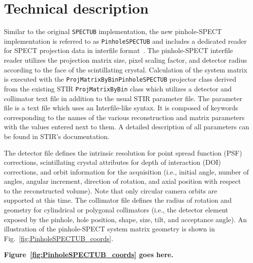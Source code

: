 \documentclass[utf8]{FrontiersinHarvard} %
\begin{document}
\section{Technical description}

Similar to the original \texttt{SPECTUB} implementation, the new pinhole-SPECT implementation is referred to as \texttt{PinholeSPECTUB} and includes a dedicated reader for SPECT projection data in interfile format~\cite{interfile}. The pinhole-SPECT interfile reader utilizes the projection matrix size, pixel scaling factor, and detector radius according to the face of the scintillating crystal. Calculation of the system matrix is executed with the \texttt{ProjMatrixByBinPinholeSPECTUB} projector class derived from the existing STIR \texttt{ProjMatrixByBin} class which utilizes a detector and collimator text file in addition to the usual STIR parameter file. The parameter file is a text file which uses an Interfile-like syntax. It is composed of keywords corresponding to the names of the various reconstruction and matrix parameters with the values entered next to them. A detailed description of all parameters can be found in STIR's documentation.

The detector file defines the intrinsic resolution for point spread function (PSF) corrections, scintillating crystal attributes for depth of interaction (DOI) corrections, and orbit information for the acquisition (i.e., initial angle, number of angles, angular increment, direction of rotation, and axial position with respect to the reconstructed volume). Note that only circular camera orbits are supported at this time. The collimator file defines the radius of rotation and geometry for cylindrical or polygonal collimators (i.e., the detector element exposed by the pinhole, hole position, shape, size, tilt, and acceptance angle). An illustration of the pinhole-SPECT system matrix geometry is shown in Fig.~\ref{fig:PinholeSPECTUB_coords}.

\noindent \textbf{Figure~\ref{fig:PinholeSPECTUB_coords} goes here.}
\end{document}
